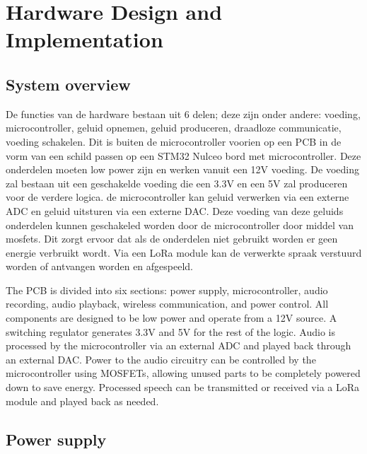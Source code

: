 \section{Hardware Design and Implementation}

\subsection{System overview}
De functies van de hardware bestaan uit 6 delen; deze zijn onder andere: voeding, microcontroller, geluid opnemen, geluid produceren, draadloze communicatie, voeding schakelen.
Dit is buiten de microcontroller voorien op een PCB in de vorm van een schild passen op een STM32 Nulceo bord met microcontroller.
Deze onderdelen moeten low power zijn en werken vanuit een 12V voeding.
De voeding zal bestaan uit een geschakelde voeding die een 3.3V en een 5V zal produceren voor de verdere logica. 
de microcontroller kan geluid verwerken via een externe ADC en geluid uitsturen via een externe DAC.
Deze voeding van deze geluids onderdelen kunnen geschakeled worden door de microcontroller door middel van mosfets.
Dit zorgt ervoor dat als de onderdelen niet gebruikt worden er geen energie verbruikt wordt.
Via een LoRa module kan de verwerkte spraak verstuurd worden of antvangen worden en afgespeeld.

The PCB is divided into six sections: power supply, microcontroller, audio recording, audio playback,
 wireless communication, and power control.
All components are designed to be low power and operate from a 12V source.
A switching regulator generates 3.3V and 5V for the rest of the logic.
Audio is processed by the microcontroller via an external ADC and played back through an external DAC.
Power to the audio circuitry can be controlled by the microcontroller using MOSFETs, allowing unused parts to be completely powered down to save energy.
Processed speech can be transmitted or received via a LoRa module and played back as needed.

\subsection{Power supply}


